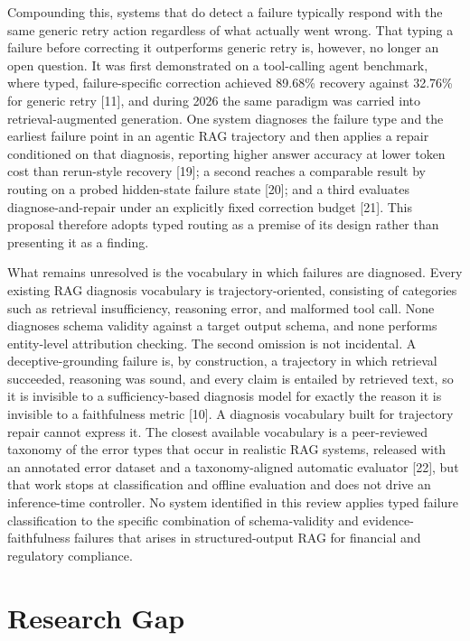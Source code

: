 \documentclass[11pt,a4paper]{article}
\begin{document}
Compounding this, systems that do detect a failure typically respond with the same
generic retry action regardless of what actually went wrong. That typing a failure
before correcting it outperforms generic retry is, however, no longer an open question.
It was first demonstrated on a tool-calling agent benchmark, where typed,
failure-specific correction achieved 89.68\% recovery against 32.76\% for generic retry
[11], and during 2026 the same paradigm was carried into retrieval-augmented generation.
One system diagnoses the failure type and the earliest failure point in an agentic RAG
trajectory and then applies a repair conditioned on that diagnosis, reporting higher
answer accuracy at lower token cost than rerun-style recovery [19]; a second reaches a
comparable result by routing on a probed hidden-state failure state [20]; and a third
evaluates diagnose-and-repair under an explicitly fixed correction budget [21]. This
proposal therefore adopts typed routing as a premise of its design rather than
presenting it as a finding.

What remains unresolved is the vocabulary in which failures are diagnosed. Every
existing RAG diagnosis vocabulary is trajectory-oriented, consisting of categories such
as retrieval insufficiency, reasoning error, and malformed tool call. None diagnoses
schema validity against a target output schema, and none performs entity-level
attribution checking. The second omission is not incidental. A deceptive-grounding
failure is, by construction, a trajectory in which retrieval succeeded, reasoning was
sound, and every claim is entailed by retrieved text, so it is invisible to a
sufficiency-based diagnosis model for exactly the reason it is invisible to a
faithfulness metric [10]. A diagnosis vocabulary built for trajectory repair cannot
express it. The closest available vocabulary is a peer-reviewed taxonomy of the error
types that occur in realistic RAG systems, released with an annotated error dataset and
a taxonomy-aligned automatic evaluator [22], but that work stops at classification and
offline evaluation and does not drive an inference-time controller. No system identified
in this review applies typed failure classification to the specific combination of
schema-validity and evidence-faithfulness failures that arises in structured-output RAG
for financial and regulatory compliance.

\section{Research Gap}
\end{document}
